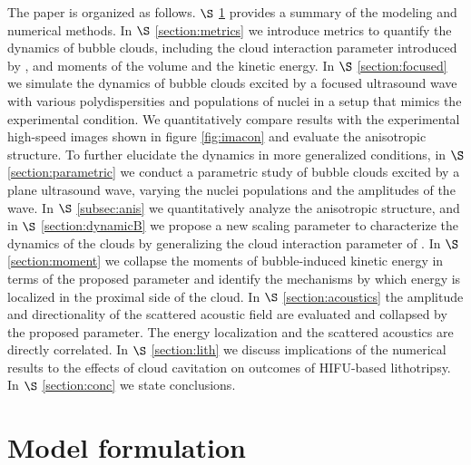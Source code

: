 \documentclass{jfm}
\begin{document}
The paper is organized as follows.
$\S$ \ref{section:model} provides a summary of the modeling and numerical methods.
In $\S$ \ref{section:metrics} we introduce metrics to quantify the dynamics of bubble clouds, including the cloud interaction parameter introduced by \citet{dAgostino89}, and moments of the volume and the kinetic energy.
In $\S$ \ref{section:focused} we simulate the dynamics of bubble clouds excited by a focused ultrasound wave with various polydispersities and populations of nuclei in a setup that mimics the experimental condition. We quantitatively compare results with the experimental high-speed images shown in figure \ref{fig:imacon} and evaluate the anisotropic structure.
To further elucidate the dynamics in more generalized conditions, in $\S$ \ref{section:parametric} we conduct a parametric study of bubble clouds excited by a plane ultrasound wave, varying the nuclei populations and the amplitudes of the wave.
In $\S$ \ref{subsec:anis} we quantitatively analyze the anisotropic structure, and in $\S$ \ref{section:dynamicB} we propose a new scaling parameter to characterize the dynamics of the clouds by generalizing the cloud interaction parameter of \cite{dAgostino89}.
In $\S$ \ref{section:moment} we collapse the moments of bubble-induced kinetic energy in terms of the proposed parameter and identify the mechanisms by which energy is localized in the proximal side of the cloud.
In $\S$ \ref{section:acoustics} the amplitude and directionality of the scattered acoustic field are evaluated and collapsed by the proposed parameter. The energy localization and the scattered acoustics are directly correlated.
In $\S$ \ref{section:lith} we discuss implications of the numerical results to the effects of cloud cavitation on outcomes of HIFU-based lithotripsy.
In $\S$ \ref{section:conc} we state conclusions.

\section{Model formulation}
\label{section:model}
\end{document}
